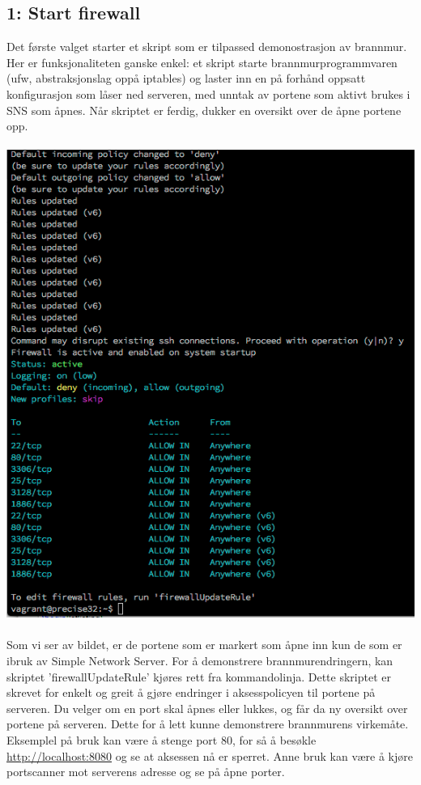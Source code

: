 \documentclass{article}
\begin{document}
\subsection{1: Start firewall}
Det første valget starter et skript som er tilpassed demonostrasjon av brannmur. \\ Her er funksjonaliteten ganske enkel: et skript starte brannmurprogrammvaren (ufw, abstraksjonslag oppå iptables) og laster inn en på forhånd oppsatt konfigurasjon som låser ned serveren, med unntak av portene som aktivt brukes i SNS som åpnes. Når skriptet er ferdig, dukker en oversikt over de åpne portene opp. 
\\ \\
\includegraphics[scale = 0.7]{pictures/firewall.png}
\\ \\ 
Som vi ser av bildet, er de portene som er markert som åpne inn kun de som er ibruk av Simple Network Server. 
For å demonstrere brannmurendringern, kan skriptet 'firewallUpdateRule' kjøres rett fra kommandolinja. Dette skriptet er skrevet for enkelt og greit å gjøre endringer i aksesspolicyen til portene på serveren. Du velger om en port skal åpnes eller lukkes, og får da ny oversikt over portene på serveren. Dette for å lett kunne demonstrere brannmurens virkemåte. Eksemplel på bruk kan være å stenge port 80, for så å besøkle \url{http://localhost:8080} og se at aksessen nå er sperret. Anne bruk kan være å kjøre portscanner mot serverens adresse og se på åpne porter. 
\end{document}

